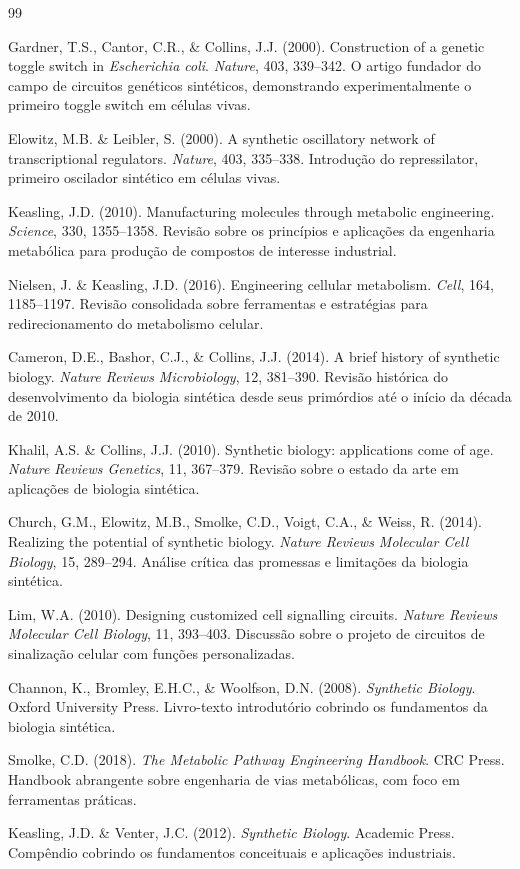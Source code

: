 \begin{thebibliography}{99}

 Gardner, T.S., Cantor, C.R., \& Collins, J.J. (2000). Construction of a genetic toggle switch in \textit{Escherichia coli}. \textit{Nature}, 403, 339--342. O artigo fundador do campo de circuitos genéticos sintéticos, demonstrando experimentalmente o primeiro toggle switch em células vivas.

 Elowitz, M.B. \& Leibler, S. (2000). A synthetic oscillatory network of transcriptional regulators. \textit{Nature}, 403, 335--338. Introdução do repressilator, primeiro oscilador sintético em células vivas.

 Keasling, J.D. (2010). Manufacturing molecules through metabolic engineering. \textit{Science}, 330, 1355--1358. Revisão sobre os princípios e aplicações da engenharia metabólica para produção de compostos de interesse industrial.

 Nielsen, J. \& Keasling, J.D. (2016). Engineering cellular metabolism. \textit{Cell}, 164, 1185--1197. Revisão consolidada sobre ferramentas e estratégias para redirecionamento do metabolismo celular.

 Cameron, D.E., Bashor, C.J., \& Collins, J.J. (2014). A brief history of synthetic biology. \textit{Nature Reviews Microbiology}, 12, 381--390. Revisão histórica do desenvolvimento da biologia sintética desde seus primórdios até o início da década de 2010.

 Khalil, A.S. \& Collins, J.J. (2010). Synthetic biology: applications come of age. \textit{Nature Reviews Genetics}, 11, 367--379. Revisão sobre o estado da arte em aplicações de biologia sintética.

 Church, G.M., Elowitz, M.B., Smolke, C.D., Voigt, C.A., \& Weiss, R. (2014). Realizing the potential of synthetic biology. \textit{Nature Reviews Molecular Cell Biology}, 15, 289--294. Análise crítica das promessas e limitações da biologia sintética.

 Lim, W.A. (2010). Designing customized cell signalling circuits. \textit{Nature Reviews Molecular Cell Biology}, 11, 393--403. Discussão sobre o projeto de circuitos de sinalização celular com funções personalizadas.

 Channon, K., Bromley, E.H.C., \& Woolfson, D.N. (2008). \textit{Synthetic Biology}. Oxford University Press. Livro-texto introdutório cobrindo os fundamentos da biologia sintética.

 Smolke, C.D. (2018). \textit{The Metabolic Pathway Engineering Handbook}. CRC Press. Handbook abrangente sobre engenharia de vias metabólicas, com foco em ferramentas práticas.

 Keasling, J.D. \& Venter, J.C. (2012). \textit{Synthetic Biology}. Academic Press. Compêndio cobrindo os fundamentos conceituais e aplicações industriais.

\end{thebibliography}

